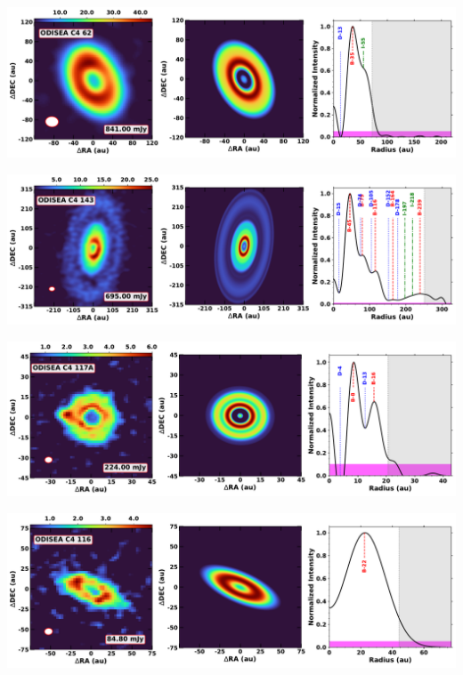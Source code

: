 \noindent
\begin{minipage}{.49\textwidth}
	 \centering
	 	 \hrulesep
	 	 \includegraphics[width=1\linewidth]{pdf/4+II/099_odisea_c4_62_cutout.pdf}
\end{minipage}%
\vrulesep
\begin{minipage}{.49\textwidth}
	 \centering
	 	 \hrulesep
	 	 \includegraphics[width=1\linewidth]{pdf/4+II/096_odisea_c4_143_cutout.pdf}
\end{minipage}%
\vspace{0pt}
\begin{minipage}{.49\textwidth}
	 \centering
	 	 \hrulesep
	 	 \includegraphics[width=1\linewidth]{pdf/4+II/083_odisea_c4_117a_cutout.pdf}
\end{minipage}%
\vrulesep
\begin{minipage}{.49\textwidth}
	 \centering
	 	 \hrulesep
	 	 \includegraphics[width=1\linewidth]{pdf/4+II/061_odisea_c4_116_cutout.pdf}
\end{minipage}%

